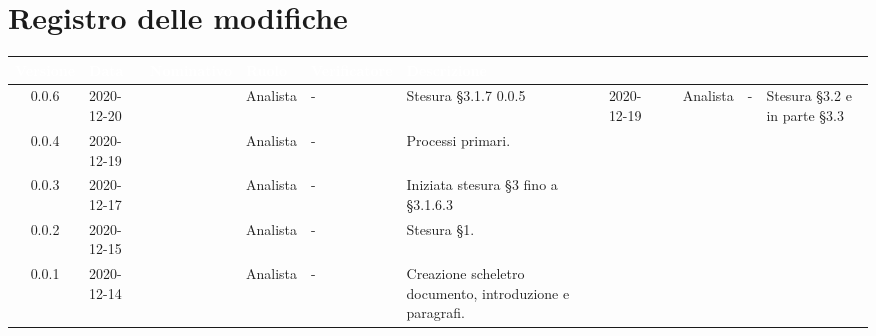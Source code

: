 \section*{Registro delle modifiche}
{
\renewcommand{\arraystretch}{1.5}
\centering
\begin{longtable}{c C{2.6cm} C{2.6cm} C{2.6cm} C{2.6cm} C{3.5cm}}
\textcolor{white}{\textbf{Versione}}&
\textcolor{white}{\textbf{Data}}&
\textcolor{white}{\textbf{Nominativo}}&
\textcolor{white}{\textbf{Ruolo}}&
\textcolor{white}{\textbf{Verificatore}}&
\textcolor{white}{\textbf{Descrizione}}\\	
\endhead

0.0.6 & 2020-12-20 & \PA{} & Analista & - & Stesura \S 3.1.7
0.0.5 & 2020-12-19 & \RA{} & Analista & - & Stesura \S 3.2 e in parte \S 3.3 \\
0.0.4 & 2020-12-19 & \ZM{} & Analista & - & Processi primari. \\
0.0.3 & 2020-12-17 & \PA{} & Analista & - & Iniziata stesura \S 3 fino a \S 3.1.6.3 \\
0.0.2 & 2020-12-15 & \PA{} & Analista & - & Stesura \S 1. \\
0.0.1 & 2020-12-14 & \ZM{} & Analista & - & Creazione scheletro documento, introduzione e paragrafi. \\
		
\end{longtable}
}

